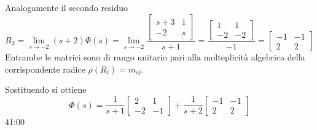 Analogamente il secondo residuo
$$
R_2 = \lim_{s\to -2} (s+2) \Phi(s) = \lim_{s\to -2} \frac{
\begin{bmatrix}
 s+3 & 1 \\ -2 & s
\end{bmatrix}
}{s+1} =
\frac{
\begin{bmatrix}
 1 & 1 \\ -2 & -2
\end{bmatrix}
}{-1} = \begin{bmatrix}
 -1 & -1 \\ 2 & 2
\end{bmatrix}
$$
Entrambe le matrici sono di rango unitario pari alla molteplicità
algebrica della corrispondente radice $\rho(R_i) = m_{ai}$.

Sostituendo si ottiene
$$
\Phi(s) = \frac{1}{s+1}\begin{bmatrix}
                        2 & 1 \\ -2 & -1
                       \end{bmatrix}
+ \frac{1}{s+2}
\begin{bmatrix}
 -1 & -1 \\ 2 & 2
\end{bmatrix}
$$
41:00
